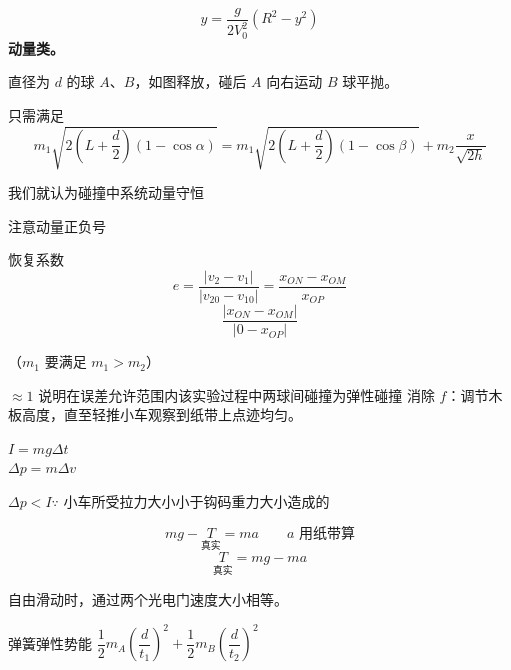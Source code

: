 \[y=\frac{g}{2V_0^2}(R^2-y^2)\]
\textbf{动量类。}

直径为 $d$ 的球 $A$、$B$，如图释放，碰后 $A$ 向右运动 $B$ 球平抛。


只需满足
\[ m_1\sqrt{2\left(L+\frac{d}{2}\right)(1-\cos\alpha)}=m_1\sqrt{2\left(L+\frac{d}{2}\right)(1-\cos\beta)}+m_2\frac{x}{\sqrt{2h}} \]

我们就认为碰撞中系统动量守恒

注意动量正负号 %

恢复系数
\[ e=\frac{|v_2-v_1|}{|v_{20}-v_{10}|}=\frac{x_{ON}-x_{OM}}{x_{OP}} \]
\[ \frac{|x_{ON}-x_{OM}|}{|0-x_{OP}|} \]

（$m_1$ 要满足 $m_1>m_2$）

$\approx1$ 说明在误差允许范围内该实验过程中两球间碰撞为弹性碰撞
消除 $f$：调节木板高度，直至轻推小车观察到纸带上点迹均匀。


$I=mg\Delta t$\\
$\Delta p=m\Delta v$

$\Delta p<I$\quad $\because$ 小车所受拉力大小小于钩码重力大小造成的

\[ mg-\underset{\text{真实}}{T}=ma\qquad a\text{ 用纸带算} \]
\[ \underset{\text{真实}}{T}=mg-ma \]

自由滑动时，通过两个光电门速度大小相等。

弹簧弹性势能 $\dfrac12m_A\left(\dfrac{d}{t_1}\right)^2+\dfrac12m_B\left(\dfrac{d}{t_2}\right)^2$

